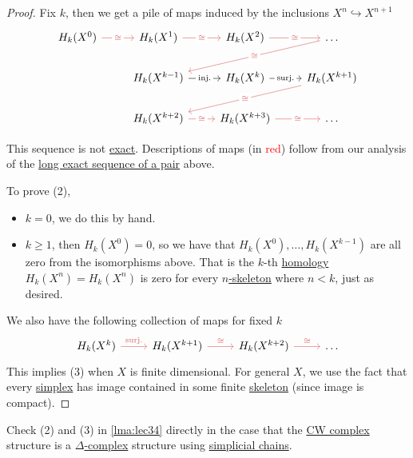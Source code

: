 \begin{proof}
	Fix \(k\), then we get a pile of maps induced by the inclusions \(X^n \hookrightarrow X^{n + 1}\)
	\[
		\begin{tikzcd}
			{H_k(X^0)} & {H_k(X^1)} & {H_k(X^2)} & \dots \\
			& {H_k(X^{k-1})} & {H_k(X^{k})} & {H_k(X^{k+1})} \\
			& {H_k(X^{k+2})} & {H_k(X^{k+3})} & \dots
			\arrow["\cong"{description}, color={rgb,255:red,214;green,92;blue,92}, from=1-4, to=2-2]
			\arrow["{\text{inj.}}"{description}, from=2-2, to=2-3]
			\arrow["{\text{surj.}}"{description}, from=2-3, to=2-4]
			\arrow["\cong"{description}, color={rgb,255:red,214;green,92;blue,92}, from=2-4, to=3-2]
			\arrow["\cong"{description}, color={rgb,255:red,214;green,92;blue,92}, from=3-2, to=3-3]
			\arrow["\cong"{description}, color={rgb,255:red,214;green,92;blue,92}, from=3-3, to=3-4]
			\arrow["\cong"{description}, color={rgb,255:red,214;green,92;blue,92}, from=1-1, to=1-2]
			\arrow["\cong"{description}, color={rgb,255:red,214;green,92;blue,92}, from=1-2, to=1-3]
			\arrow["\cong"{description}, color={rgb,255:red,214;green,92;blue,92}, from=1-3, to=1-4]
		\end{tikzcd}
	\]
	\begin{note}
		This sequence is not \hyperref[def:exact-sequence]{exact}. Descriptions of maps (in \textcolor{red}{red}) follow
		from our analysis of the \hyperref[thm:long-exact-sequence-of-a-pair]{long exact sequence of a pair} above.
	\end{note}

	To prove (2),
	\begin{itemize}
		\item \(k = 0\), we do this by hand.
		\item \(k \geq 1\), then \(H_k(X^0) = 0\), so we have that \(H_k(X^0), \dots, H_k(X^{k - 1})\) are all zero from the
		      isomorphisms above. That is the \(k\)-th \hyperref[def:singular-homology-group]{homology} \(H_k(X^n) = H_k(X^n)\)
		      is zero for every \hyperref[def:skeleton]{\(n\)-skeleton} where \(n < k\), just as desired.
	\end{itemize}
	We also have the following collection of maps for fixed \(k\)
	\[
		\begin{tikzcd}
			{H_k(X^k)} & {H_k(X^{k+1})} & {H_k(X^{k+2})} & \dots
			\arrow["{\text{surj.}}", color={rgb,255:red,214;green,92;blue,92}, from=1-1, to=1-2]
			\arrow["\cong", color={rgb,255:red,214;green,92;blue,92}, from=1-2, to=1-3]
			\arrow["\cong", color={rgb,255:red,214;green,92;blue,92}, from=1-3, to=1-4]
		\end{tikzcd}
	\]
	This implies (3) when \(X\) is finite dimensional. For general \(X\), we use the fact that every \hyperref[def:standard-simplex]{simplex}
	has image contained in some finite \hyperref[def:skeleton]{skeleton} (since image is compact).
\end{proof}
\begin{exercise}
	Check (2) and (3) in \autoref{lma:lec34} directly in the case that the \hyperref[def:CW-Complex]{CW complex} structure is a \hyperref[def:delta-complex]{\(\Delta\)-complex}
	structure using \hyperref[def:simplicial-chain-group]{simplicial chains}.
\end{exercise}

